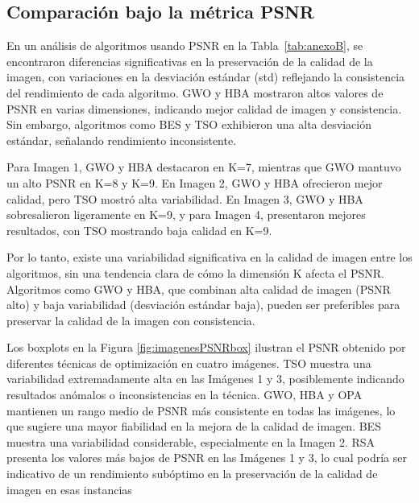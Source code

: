 \documentclass[conference]{IEEEtran}
\begin{document}
\subsection{Comparación bajo la métrica PSNR}
\noindent En un análisis de algoritmos usando PSNR en la Tabla~\ref{tab:anexoB}, se encontraron diferencias significativas en la preservación de la calidad de la imagen, con variaciones en la desviación estándar (std) reflejando la consistencia del rendimiento de cada algoritmo. GWO y HBA mostraron altos valores de PSNR en varias dimensiones, indicando mejor calidad de imagen y consistencia. Sin embargo, algoritmos como BES y TSO exhibieron una alta desviación estándar, señalando rendimiento inconsistente.

\noindent Para Imagen 1, GWO y HBA destacaron en K=7, mientras que GWO mantuvo un alto PSNR en K=8 y K=9. En Imagen 2, GWO y HBA ofrecieron mejor calidad, pero TSO mostró alta variabilidad. En Imagen 3, GWO y HBA sobresalieron ligeramente en K=9, y para Imagen 4, presentaron mejores resultados, con TSO mostrando baja calidad en K=9.

\noindent Por lo tanto, existe una variabilidad significativa en la calidad de imagen entre los algoritmos, sin una tendencia clara de cómo la dimensión K afecta el PSNR. Algoritmos como GWO y HBA, que combinan alta calidad de imagen (PSNR alto) y baja variabilidad (desviación estándar baja), pueden ser preferibles para preservar la calidad de la imagen con consistencia.

\noindent Los boxplots en la Figura \ref{fig:imagenesPSNRbox} ilustran el PSNR obtenido por diferentes técnicas de optimización en cuatro imágenes. TSO muestra una variabilidad extremadamente alta en las Imágenes 1 y 3, posiblemente indicando resultados anómalos o inconsistencias en la técnica. GWO, HBA y OPA mantienen un rango medio de PSNR más consistente en todas las imágenes, lo que sugiere una mayor fiabilidad en la mejora de la calidad de imagen. BES muestra una variabilidad considerable, especialmente en la Imagen 2. RSA presenta los valores más bajos de PSNR en las Imágenes 1 y 3, lo cual podría ser indicativo de un rendimiento subóptimo en la preservación de la calidad de imagen en esas instancias
\end{document}
